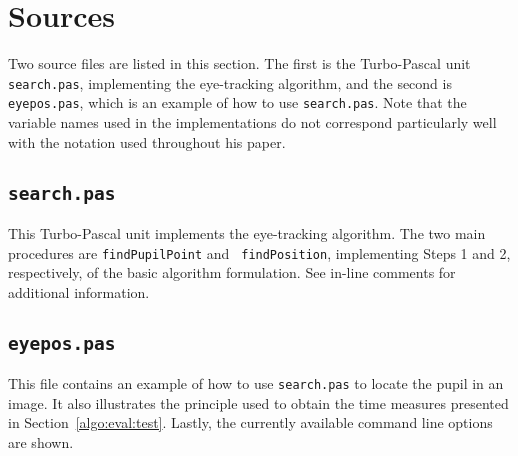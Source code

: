 
\section{Sources}
\label{implem:sources}

Two source files are listed in this section.  The first is the
Turbo-Pascal unit {\tt search.pas}, implementing the {\octopus}
eye-tracking algorithm, and the second is {\tt eyepos.pas}, which is
an example of how to use {\tt search.pas}.  Note that the variable
names used in the implementations do not correspond particularly well
with the notation used throughout his paper.

\subsection{\tt search.pas}
\label{implem:sources:search}

This Turbo-Pascal unit implements the {\octopus} eye-tracking
algorithm.  The two main procedures are {\tt findPupilPoint} and {\tt
  findPosition}, implementing Steps 1 and 2, respectively, of the
basic algorithm formulation.  See in-line comments for additional
information.
\vspace*{0.5cm}



\newpage
\subsection{\tt eyepos.pas}
\label{implem:sources:eyepos}

This file contains an example of how to use {\tt search.pas} to locate
the pupil in an image.  It also illustrates the principle used to
obtain the time measures presented in Section~\ref{algo:eval:test}.
Lastly, the currently available command line options are shown.
\vspace*{0.5cm}


